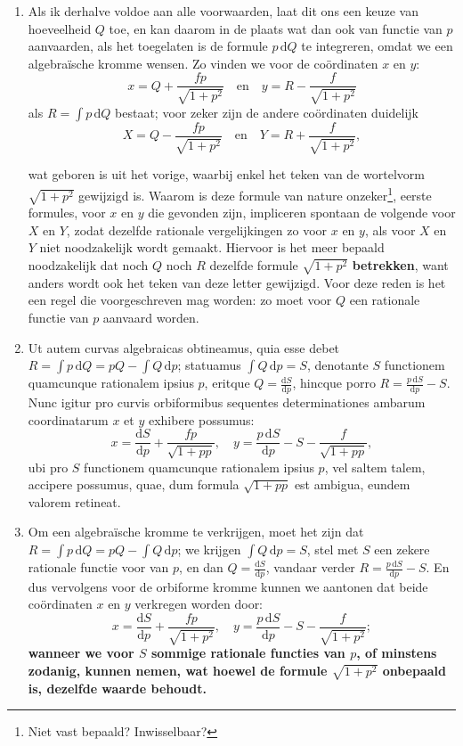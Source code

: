 \documentclass[10pt,a4paper]{article}
\newcommand{\switchenum}{\setcounter{enumi}{\arabic{enumi}-1}\switchcolumn}
\def\D{\mathrm{d}}
\begin{document}
\begin{paracol}{2}
\begin{enumerate}[topsep=1px]
		\switchenum
		\item Als ik derhalve voldoe aan alle voorwaarden, laat dit ons een keuze van hoeveelheid $Q$ toe, en kan daarom in de plaats wat dan ook van functie van $p$ aanvaarden, als het toegelaten is de formule $p\,\D Q$ te integreren, omdat we een algebraïsche kromme wensen. Zo vinden we voor de coördinaten $x$ en $y$:
		\[
			x = Q + \frac{fp}{\sqrt{1+p^2}} \quad\text{en}\quad y = R - \frac{f}{\sqrt{1+p^2}}
		\]
		als $R=\int p \,\D Q$ bestaat; voor zeker zijn de andere coördinaten duidelijk
		\[
			X = Q- \frac{fp}{\sqrt{1+p^2}} \quad \text{en} \quad Y = R + \frac{f}{\sqrt{1+p^2}},		
		\]
		
		\newpage
		
		wat geboren is uit het vorige, waarbij enkel het teken van de wortelvorm $\sqrt{1+p^2}$ gewijzigd is. Waarom is deze formule van nature onzeker\footnote{Niet vast bepaald? Inwisselbaar?}, eerste formules, voor $x$ en $y$ die gevonden zijn, impliceren spontaan de volgende voor $X$ en $Y$, zodat dezelfde rationale vergelijkingen zo voor $x$ en $y$, als voor $X$ en $Y$ niet noodzakelijk wordt gemaakt. Hiervoor is het meer bepaald noodzakelijk dat noch $Q$ noch $R$ dezelfde formule $\sqrt{1+p^2}$ \textbf{betrekken}, want anders wordt ook het teken van deze letter gewijzigd.  Voor deze reden is het een regel die voorgeschreven mag worden: zo moet voor $Q$ een rationale functie van $p$ aanvaard worden.
		
		
		\switchcolumn*
		
		\item Ut autem curvas algebraicas obtineamus, quia esse debet $R = \int p \,\D Q = pQ - \int Q \,\D p$; statuamus $\int Q \,\D p = S$, denotante $S$ functionem quamcunque rationalem ipsius $p$, eritque $Q = \frac{\D S}{\D p}$, hincque porro $R = \frac{p\,\D S}{\D p}-S$. Nunc igitur pro curvis orbiformibus sequentes determinationes ambarum coordinatarum $x$ et $y$ exhibere possumus:
		\[
			x = \frac{\D S}{\D p} + \frac{fp}{\sqrt{1+pp}}, \quad y = \frac{p\,\D S}{\D p} -S - \frac{f}{\sqrt{1+pp}},
		\]
		ubi pro $S$ functionem quamcunque rationalem ipsius $p$, vel saltem talem, accipere possumus, quae, dum formula $\sqrt{1+pp}$ est ambigua, eundem valorem retineat.
		
		\switchenum
		\item Om een algebraïsche kromme te verkrijgen, moet het zijn dat $R = \int p \,\D Q = pQ - \int Q \,\D p$; we krijgen  $\int Q \,\D p = S$, stel met $S$ een zekere rationale functie voor van $p$, en dan $Q = \frac{\D S}{\D p}$, vandaar verder $R = \frac{p\,\D S}{\D p}-S$. En dus vervolgens voor de orbiforme kromme kunnen we aantonen dat beide coördinaten $x$ en $y$ verkregen worden door: 
		\[
			x = \frac{\D S}{\D p} + \frac{fp}{\sqrt{1+p^2}}, \quad y = \frac{p\,\D S}{\D p} -S - \frac{f}{\sqrt{1+p^2}};
		\]
		\textbf{wanneer we voor $S$ sommige rationale functies van $p$, of minstens zodanig, kunnen nemen, wat hoewel de formule $\sqrt{1+p^2}$ onbepaald is, dezelfde waarde behoudt.}
		

\end{enumerate}
\end{paracol}
\end{document}
